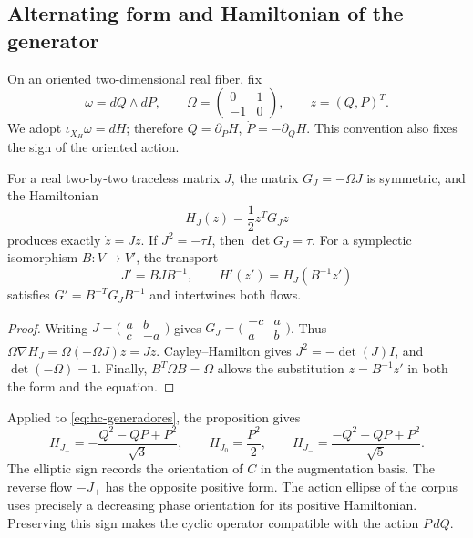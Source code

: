 \subsection{Alternating form and Hamiltonian of the generator}

On an oriented two-dimensional real fiber, fix
\[
 \omega=dQ\wedge dP,\qquad
 \Omega=\begin{pmatrix}0&1\\-1&0\end{pmatrix},\qquad z=(Q,P)^T.
\]
We adopt \(\iota_{X_H}\omega=dH\); therefore
\(\dot Q=\partial_PH\), \(\dot P=-\partial_QH\).
This convention also fixes the sign of the oriented action.

\begin{proposition}
\label{prop:hc-cuadratica}
For a real two-by-two traceless matrix \(J\), the matrix
\(G_J=-\Omega J\) is symmetric, and the Hamiltonian
\begin{equation}
 H_J(z)=\frac12z^TG_Jz
 \label{eq:hc-hj}
\end{equation}
produces exactly \(\dot z=Jz\). If \(J^2=-\tau I\),
then \(\det G_J=\tau\). For a symplectic isomorphism
\(B:V\to V'\), the transport
\[
 J'=BJB^{-1},\qquad H'(z')=H_J(B^{-1}z')
\]
satisfies \(G'=B^{-T}G_JB^{-1}\) and intertwines both flows.
\end{proposition}
\begin{proof}
Writing \(J=\bigl(\begin{smallmatrix}a&b\\c&-a\end{smallmatrix}\bigr)\)
gives \(G_J=\bigl(\begin{smallmatrix}-c&a\\a&b\end{smallmatrix}\bigr)\).
Thus \(\Omega\nabla H_J=\Omega(-\Omega J)z=Jz\).
Cayley--Hamilton gives \(J^2=-\det(J)I\), and
\(\det(-\Omega)=1\). Finally, \(B^T\Omega B=\Omega\)
allows the substitution \(z=B^{-1}z'\) in both the form and the equation.
\end{proof}

Applied to \eqref{eq:hc-generadores}, the proposition gives
\begin{equation}
 H_{J_+}=-\frac{Q^2-QP+P^2}{\sqrt3},\qquad
 H_{J_0}=\frac{P^2}{2},\qquad
 H_{J_-}=\frac{-Q^2-QP+P^2}{\sqrt5}.
 \label{eq:hc-hamiltonianos-nativos}
\end{equation}
The elliptic sign records the orientation of \(C\) in the augmentation basis.
The reverse flow \(-J_+\) has the opposite positive form. The action
ellipse of the corpus uses precisely a decreasing phase orientation
for its positive Hamiltonian. Preserving this sign makes
the cyclic operator compatible with the action \(P\,dQ\).


